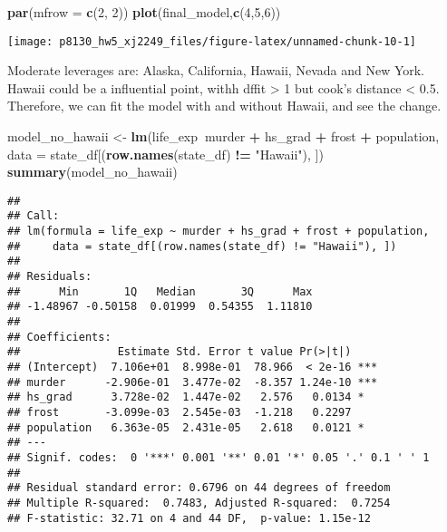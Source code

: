 \documentclass[]{article}
\newenvironment{Shaded}{\begin{snugshade}}{\end{snugshade}}
\newcommand{\DataTypeTok}[1]{\textcolor[rgb]{0.13,0.29,0.53}{#1}}
\newcommand{\DecValTok}[1]{\textcolor[rgb]{0.00,0.00,0.81}{#1}}
\newcommand{\KeywordTok}[1]{\textcolor[rgb]{0.13,0.29,0.53}{\textbf{#1}}}
\newcommand{\NormalTok}[1]{#1}
\newcommand{\OperatorTok}[1]{\textcolor[rgb]{0.81,0.36,0.00}{\textbf{#1}}}
\newcommand{\StringTok}[1]{\textcolor[rgb]{0.31,0.60,0.02}{#1}}
\begin{document}
\begin{Shaded}
\begin{Highlighting}[]
\KeywordTok{par}\NormalTok{(}\DataTypeTok{mfrow =} \KeywordTok{c}\NormalTok{(}\DecValTok{2}\NormalTok{, }\DecValTok{2}\NormalTok{))}
\KeywordTok{plot}\NormalTok{(final_model,}\KeywordTok{c}\NormalTok{(}\DecValTok{4}\NormalTok{,}\DecValTok{5}\NormalTok{,}\DecValTok{6}\NormalTok{))}
\end{Highlighting}
\end{Shaded}

\texttt{[image: p8130\_hw5\_xj2249\_files/figure-latex/unnamed-chunk-10-1]}

Moderate leverages are: Alaska, California, Hawaii, Nevada and New York.
Hawaii could be a influential point, withh dffit \textgreater{} 1 but
cook's distance \textless{} 0.5. Therefore, we can fit the model with
and without Hawaii, and see the change.

\begin{Shaded}
\begin{Highlighting}[]
\NormalTok{model_no_hawaii <-}\StringTok{ }\KeywordTok{lm}\NormalTok{(life_exp}\OperatorTok{~}\NormalTok{murder }\OperatorTok{+}\StringTok{ }\NormalTok{hs_grad }\OperatorTok{+}\StringTok{ }\NormalTok{frost }\OperatorTok{+}\StringTok{ }\NormalTok{population,}
                      \DataTypeTok{data =}\NormalTok{ state_df[(}\KeywordTok{row.names}\NormalTok{(state_df) }\OperatorTok{!=}\StringTok{ "Hawaii"}\NormalTok{), ])}
\KeywordTok{summary}\NormalTok{(model_no_hawaii)}
\end{Highlighting}
\end{Shaded}

\begin{verbatim}
## 
## Call:
## lm(formula = life_exp ~ murder + hs_grad + frost + population, 
##     data = state_df[(row.names(state_df) != "Hawaii"), ])
## 
## Residuals:
##      Min       1Q   Median       3Q      Max 
## -1.48967 -0.50158  0.01999  0.54355  1.11810 
## 
## Coefficients:
##               Estimate Std. Error t value Pr(>|t|)    
## (Intercept)  7.106e+01  8.998e-01  78.966  < 2e-16 ***
## murder      -2.906e-01  3.477e-02  -8.357 1.24e-10 ***
## hs_grad      3.728e-02  1.447e-02   2.576   0.0134 *  
## frost       -3.099e-03  2.545e-03  -1.218   0.2297    
## population   6.363e-05  2.431e-05   2.618   0.0121 *  
## ---
## Signif. codes:  0 '***' 0.001 '**' 0.01 '*' 0.05 '.' 0.1 ' ' 1
## 
## Residual standard error: 0.6796 on 44 degrees of freedom
## Multiple R-squared:  0.7483, Adjusted R-squared:  0.7254 
## F-statistic: 32.71 on 4 and 44 DF,  p-value: 1.15e-12
\end{verbatim}
\end{document}
